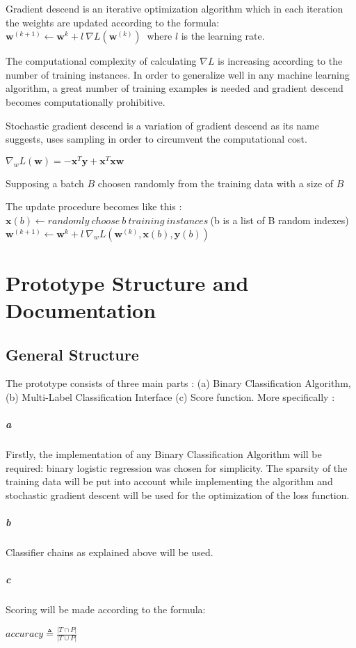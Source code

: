 \documentclass[10pt,letterpaper]{article}
\begin{document}
	 Gradient descend is an iterative optimization algorithm which in each iteration the weights are updated according to the formula:
	 $\textbf{w}^{(k+1)} \leftarrow \textbf{w}^{k} + l\ \nabla L(\textbf{w}^{(k)}) \ $ where $l$ is the learning rate. 
	 
	 The computational complexity of calculating $\nabla L$ is increasing according to the number of training instances. In order to generalize well in any machine learning algorithm, a great number of training examples is needed and gradient descend becomes computationally prohibitive.
	 
	 Stochastic gradient descend is a variation of gradient descend as its name suggests, uses sampling in order to circumvent the computational cost.
	 
	 
	 $\nabla_{w} L(\textbf{w}) = - \textbf{x}^{T}\textbf{y}+\textbf{x}^{T}\textbf{x}\textbf{w} $
	 
	 Supposing a batch $B$ choosen randomly from the training data with a size of $B$
	 
	 The update procedure becomes like this : 
	 $\textbf{x}(b) \leftarrow randomly\ choose\  b \ training \ instances\ $(b is a list of B random indexes)
	 $\textbf{w}^{(k+1)} \leftarrow \textbf{w}^{k} + l\ \nabla_{w} L(\textbf{w}^{(k)}, \textbf{x}(b),\textbf{y}(b))$
	 
	\section*{Prototype Structure and Documentation}
	\subsection*{General Structure}
	The prototype consists of three main parts : (a) Binary Classification Algorithm, (b) Multi-Label Classification Interface (c) Score function.  More specifically :

	\subparagraph{a}Firstly, the implementation of any Binary Classification Algorithm will be required: binary logistic regression was chosen for simplicity. 
	The sparsity of the training data will be put into account while implementing the algorithm and stochastic gradient descent will be used for the optimization of the loss function.
	
	\subparagraph{b}Classifier chains as explained above will be used.
	
	\subparagraph{c}Scoring will be made according to the formula:
	\begin{center}
		$accuracy \triangleq \frac{|T \cap P|}{|T \cup P |}$
	\end{center}
	
\end{document}
